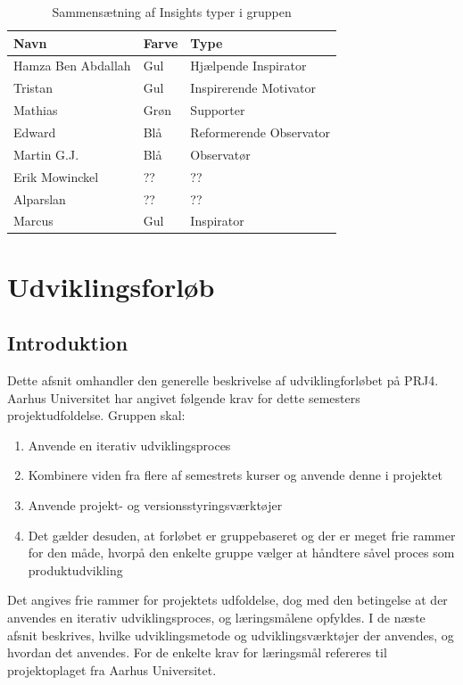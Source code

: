 \documentclass[a4paper,12pt,fleqn,oneside]{article}
\begin{document}
\begin{table}[H]
\centering
\begin{tabular}{|L{0.2\textwidth}|L{0.2\textwidth}|L{0.4\textwidth}|}
\hline
\textbf{Navn} & \textbf{Farve} & \textbf{Type} \\ \hline
Hamza Ben Abdallah & Gul & Hjælpende Inspirator \\ \hline
Tristan & Gul & Inspirerende Motivator\\ \hline
Mathias & Grøn & Supporter \\ \hline
Edward & Blå & Reformerende Observator \\ \hline
Martin G.J. & Blå  & Observatør \\ \hline
Erik Mowinckel & ?? & ??  \\ \hline
Alparslan & ?? & ?? \\ \hline
Marcus & Gul & Inspirator \\ \hline
\end{tabular}
\caption{Sammensætning af Insights typer i gruppen}
\label{table_group_types}
\end{table}

\section{Udviklingsforløb}
\subsection{Introduktion}
Dette afsnit omhandler den generelle beskrivelse af udviklingforløbet på PRJ4. Aarhus Universitet har angivet følgende krav for dette semesters projektudfoldelse. Gruppen skal: 
\begin{enumerate}
    \item Anvende en iterativ udviklingsproces
    \item Kombinere viden fra flere af semestrets kurser og anvende denne i projektet
    \item Anvende projekt- og versionsstyringsværktøjer
    \item Det gælder desuden, at forløbet er gruppebaseret og der er meget frie rammer for den måde, hvorpå den enkelte gruppe vælger at håndtere såvel proces som produktudvikling
    \end{enumerate}
Det angives frie rammer for projektets udfoldelse, dog med den betingelse at der anvendes en iterativ udviklingsproces, og læringsmålene opfyldes. I de næste afsnit beskrives, hvilke udviklingsmetode og udviklingsværktøjer der anvendes, og hvordan det anvendes. For de enkelte krav for læringsmål refereres til projektoplaget fra Aarhus Universitet. 
\end{document}
